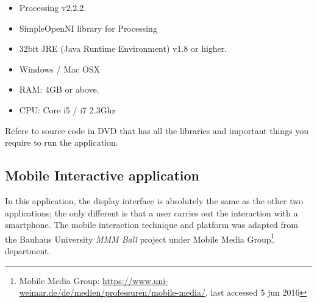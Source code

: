 \begin{itemize}
\item Processing v2.2.2.
\item SimpleOpenNI library for Processing \cite{simpleopenni}
\item 32bit JRE (Java Runtime Environment) v1.8 or higher.
\item Windows / Mac OSX
\item RAM: 4GB or above.
\item CPU: Core i5 / i7 2.3Ghz
\end{itemize}

Refere to source code in DVD that has all the libraries and important things you require to run the application.

\fi

\subsection{Mobile Interactive application}
In this application, the display interface is absolutely the same as the other two applications; the only different is that a user carries out the interaction with a smartphone. The mobile interaction technique and platform was adapted from the Bauhaus University \emph{MMM Ball}\cite{MMMball, MMMball2} project under Mobile Media Group\footnote{Mobile Media Group: \url{https://www.uni-weimar.de/de/medien/professuren/mobile-media/}, last accessed 5 jun 2016} department.

